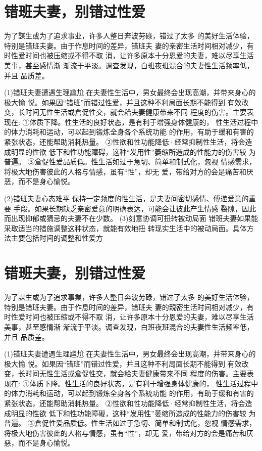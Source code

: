\documentclass[12pt,UTF8]{ctexbook}
\begin{document}
\section{错班夫妻，别错过性爱}

为了謀生或为了追求事业，许多人整日奔波劳碌，错过了太多
的美好生活体验，特别是错班夫妻。由于作息时间的差异，错班夫
妻的亲密生活时间相对减少，有时性爱时间也被压缩或不得不取
消，让许多原本十分恩爱的夫妻，难以尽享生活美事，甚至感情渐
渐流于平淡。调查发现，白班夜班混合的夫妻性生活频率低，并且
品质差。

(1)错班夫妻遭遇生理尴尬
在夫妻性生活中，男女最终会出现高潮，并带来身心的极大愉
悦。如果因“错班”而错过性爱，并且这种不利局面长期不能得到
有效改变，长时间无性生活或倉促性交，就会耠夫妻健康带来不同
程度的伤害。主要表现在:
①体质下降。性生活的良好状态，是有利于增强身体健康的，
性生活过程中的体力消耗和运动，可以起到锻炼全身各个系统功能
的作用，有助于缓和有害的紧张状态，还能帮助消耗热量。
②性欲和性功能降低·经常抑制性生活，将会造成明显的性欲
低下和性功能障碍，这种“发用性”萎缩所造成的性能力的伤害较
为普遍。
③倉促性爱品质低。性生活如过于急切、简单和制式化，忽视
情感需求，将极大地伤害彼此的人格与情感，虽有“性”，却无
爱，带给对方的会是痛苦和厌恶，而不是身心愉悦。

(2)错班夫妻心态难平
保持一定频度的性生活，是夫妻间密切感情、傅递爱意的重要
手段。如果长期缺乏亲密爱意的明确表达，可能会让彼此产生情感
裂隙，因此而出现抑郁或猜忌的夫妻不在少数。
(3)刻意协调可扭转被动局面
错班夫妻如果能采取适当的措施调整这种状态，就能有效地扭
转现实生活中的被动局面。具体方法主要包括时间的调整和性爱方


\section{错班夫妻，别错过性爱}

为了謀生或为了追求事業，许多人整日奔波劳碌，错过了太多
的美好生活体验，特别是错班夫妻。由于作息时间的差异，错班夫
妻的親密生活时间相对减少，有时性爱时间也被压缩或不得不取
消，让许多原本十分恩爱的夫妻，难以尽享生活美事，甚至感情渐
渐流于平淡。调查发现，白班夜班混合的夫妻性生活频率低，并且
品质差。

(1)错班夫妻遭遇生理尴尬
在夫妻性生活中，男女最终会出现高潮，并带来身心的极大愉
悦。如果因“错班”而错过性爱，并且这种不利局面长期不能得到
有效改变，长时间无性生活或倉促性交，就会耠夫妻健康带来不同
程度的伤害。主要表现在:
①体质下降。性生活的良好状态，是有利于增强身体健康的，
性生活过程中的体力消耗和运动，可以起到锻炼全身各个系統功能
的作用，有助于缓和有害的紧张状态，还能帮助消耗热量。
②性欲和性功能降低·经常抑制性生活，将会造成明显的性欲
低下和性功能障礙，这种“发用性”萎缩所造成的性能力的伤害较
为普遍。
③倉促性爱品质低。性生活如过于急切、简单和制式化，忽视
情感需求，将极大地伤害彼此的人格与情感，虽有“性”，却无
爱，带给对方的会是痛苦和厌惡，而不是身心愉悦。
\end{document}
